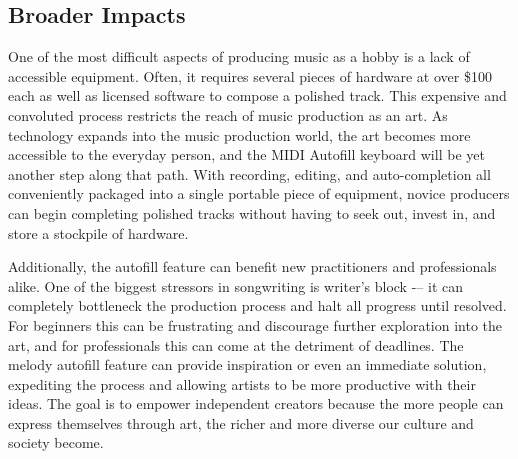 \subsection{Broader Impacts}

One of the most difficult aspects of producing music as a hobby is a lack of
accessible equipment. Often, it requires several pieces of hardware at over \$100
each as well as licensed software to compose a polished track. This expensive
and convoluted process restricts the reach of music production as an art. As
technology expands into the music production world, the art becomes more
accessible to the everyday person, and the MIDI Autofill keyboard will be yet
another step along that path. With recording, editing, and auto-completion all
conveniently packaged into a single portable piece of equipment, novice
producers can begin completing polished tracks without having to seek out,
invest in, and store a stockpile of hardware.

Additionally, the autofill feature can benefit new practitioners and
professionals alike. One of the biggest stressors in songwriting is writer’s
block -– it can completely bottleneck the production process and halt all
progress until resolved. For beginners this can be frustrating and discourage
further exploration into the art, and for professionals this can come at the
detriment of deadlines. The melody autofill feature can provide inspiration or
even an immediate solution, expediting the process and allowing artists to be
more productive with their ideas. The goal is to empower independent creators
because the more people can express themselves through art, the richer and more
diverse our culture and society become.
